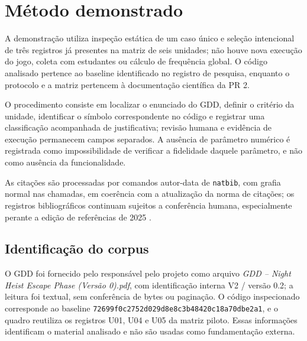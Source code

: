 \section{Método demonstrado}
A demonstração utiliza inspeção estática de um caso único e seleção intencional de três registros já presentes na matriz de seis unidades; não houve nova execução do jogo, coleta com estudantes ou cálculo de frequência global. O código analisado pertence ao baseline identificado no registro de pesquisa, enquanto o protocolo e a matriz pertencem à documentação científica da PR 2.

O procedimento consiste em localizar o enunciado do GDD, definir o critério da unidade, identificar o símbolo correspondente no código e registrar uma classificação acompanhada de justificativa; revisão humana e evidência de execução permanecem campos separados. A ausência de parâmetro numérico é registrada como impossibilidade de verificar a fidelidade daquele parâmetro, e não como ausência da funcionalidade.

As citações são processadas por comandos autor-data de \texttt{natbib}, com grafia normal nas chamadas, em coerência com a atualização da norma de citações; os registros bibliográficos continuam sujeitos a conferência humana, especialmente perante a edição de referências de 2025 \citep{abnt2023,ufes2026}.

\subsection{Identificação do corpus}
O GDD foi fornecido pelo responsável pelo projeto como arquivo \emph{GDD -- Night Heist Escape Phase (Versão 0).pdf}, com identificação interna V2 / versão 0.2; a leitura foi textual, sem conferência de bytes ou paginação. O código inspecionado corresponde ao baseline \nolinkurl{72699f0c2752d029d8e8c3b48420c18a70dbe2a1}, e o quadro reutiliza os registros U01, U04 e U05 da matriz piloto. Essas informações identificam o material analisado e não são usadas como fundamentação externa.
